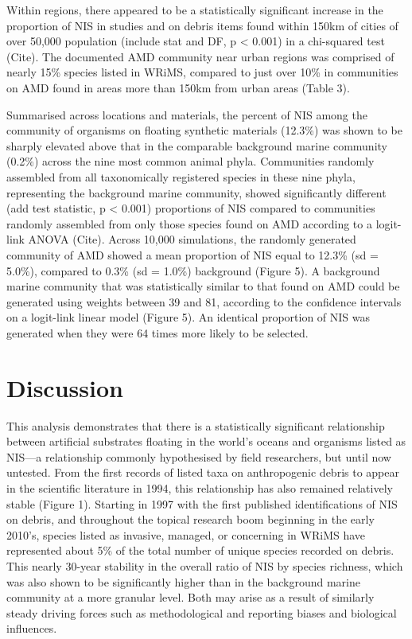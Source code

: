 \documentclass[a4paper, nobind]{templates/ociamthesis}
\begin{document}
Within regions, there appeared to be a statistically significant increase in the proportion of NIS in studies and on debris items found within 150km of cities of over 50,000 population (include stat and DF, p \textless{} 0.001) in a chi-squared test (Cite). The documented AMD community near urban regions was comprised of nearly 15\% species listed in WRiMS, compared to just over 10\% in communities on AMD found in areas more than 150km from urban areas (Table 3).

Summarised across locations and materials, the percent of NIS among the community of organisms on floating synthetic materials (12.3\%) was shown to be sharply elevated above that in the comparable background marine community (0.2\%) across the nine most common animal phyla. Communities randomly assembled from all taxonomically registered species in these nine phyla, representing the background marine community, showed significantly different (add test statistic, p \textless{} 0.001) proportions of NIS compared to communities randomly assembled from only those species found on AMD according to a logit-link ANOVA (Cite). Across 10,000 simulations, the randomly generated community of AMD showed a mean proportion of NIS equal to 12.3\% (sd = 5.0\%), compared to 0.3\% (sd = 1.0\%) background (Figure 5). A background marine community that was statistically similar to that found on AMD could be generated using weights between 39 and 81, according to the confidence intervals on a logit-link linear model (Figure 5). An identical proportion of NIS was generated when they were 64 times more likely to be selected.

\hypertarget{discussion-1}{%
\section{Discussion}\label{discussion-1}}

This analysis demonstrates that there is a statistically significant relationship between artificial substrates floating in the world's oceans and organisms listed as NIS---a relationship commonly hypothesised by field researchers, but until now untested. From the first records of listed taxa on anthropogenic debris to appear in the scientific literature in 1994, this relationship has also remained relatively stable (Figure 1). Starting in 1997 with the first published identifications of NIS on debris, and throughout the topical research boom beginning in the early 2010's, species listed as invasive, managed, or concerning in WRiMS have represented about 5\% of the total number of unique species recorded on debris. This nearly 30-year stability in the overall ratio of NIS by species richness, which was also shown to be significantly higher than in the background marine community at a more granular level. Both may arise as a result of similarly steady driving forces such as methodological and reporting biases and biological influences.
\end{document}
